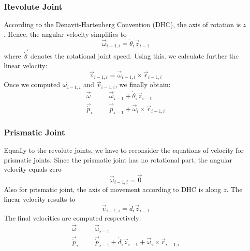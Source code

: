 \subsubsection*{Revolute Joint}
According to the Denavit-Hartenberg Convention (DHC), the axis of rotation is $z$ \cite{hartenberg-1964a}. Hence, the angular velocity simplifies to
\begin{equation}
\vec{\omega}_{i-1,i} = \dot{\theta}_i \vec{z}_{i-1}
\end{equation}
where $\vec{\dot{\theta}}$ denotes the rotational joint speed. Using this, we calculate further the linear velocity:
\begin{equation}
\vec{v}_{i-1,i} = \vec{\omega}_{i-1,i} \times \vec{r}_{i-1,i}
\end{equation}
Once we computed $\vec{\omega}_{i-1,i}$ and $\vec{v}_{i-1,i}$, we finally obtain:
\begin{eqnarray}
\vec{\omega} &=& \vec{\omega}_{i-1} + \dot{\theta}_i \vec{z}_{i-1} \\
\vec{\dot{p}}_i &=& \vec{\dot{p}}_{i-1} + \vec{\omega}_i \times\vec{r}_{i-1,i} 
\end{eqnarray}

\subsubsection*{Prismatic Joint}
Equally to the revolute joints, we have to reconsider the equations of velocity for prismatic joints. Since the prismatic joint has no rotational part, the angular velocity equals zero
\begin{equation}
\vec{\omega}_{i-1,i} = \vec{0}
\end{equation}
Also for prismatic joint, the axis of movement according to DHC is along $z$. The linear velocity results to
\begin{equation}
\vec{v}_{i-1,i} = \dot{d}_i \vec{z}_{i-1}
\end{equation}
The final velocities are computed respectively:
\begin{eqnarray}
\vec{\omega} &=& \vec{\omega}_{i-1} \\
\vec{\dot{p}}_i &=& \vec{\dot{p}}_{i-1} +\dot{d}_i \vec{z}_{i-1} + \vec{\omega}_i \times\vec{r}_{i-1,i} 
\end{eqnarray}

